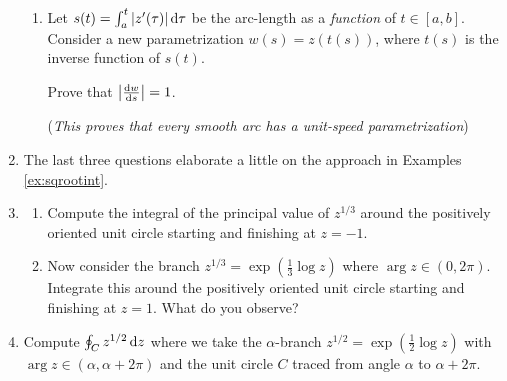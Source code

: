 \begin{exercises}
\begin{enumerate}
\begin{enumerate}
	    \item Let $s(t)=\int_a^{t}\nm{z'(\tau)}\D\tau$ be the arc-length as a \emph{function} of $t\in[a,b]$. Consider a new parametrization $w(s)=z(t(s))$, where $t(s)$ is the inverse function of $s(t)$.\par Prove that $\nm{\diff[w]{s}}=1$.\par
	  (\emph{This proves that every smooth arc has a unit-speed parametrization})
	  \end{enumerate}
	  \bigbreak
	  
	 
	  \item[]The last three questions elaborate a little on the approach in Examples \ref{ex:sqrootint}.
		
		
		\item\label{exs:cuberootalt}\begin{enumerate}
	    \item Compute the integral of the principal value of $z^{1/3}$ around the positively oriented unit circle starting and finishing at $z=-1$.
	    \item Now consider the branch $z^{1/3}=\exp(\frac 13\log z)$ where $\arg z\in(0,2\pi)$. Integrate this around the positively oriented unit circle starting and finishing at $z=1$. What do you observe?
	  \end{enumerate}
	  
	  
	  \item Compute $\oint_{C}z^{1/2}\,\dz$ where we take the $\alpha$-branch $z^{1/2} =\exp(\frac 12\log z)$ with $\arg z\in(\alpha,\alpha+2\pi)$ and the unit circle $C$ traced from angle $\alpha$ to $\alpha+2\pi$.
		

\end{enumerate}
\end{exercises}
